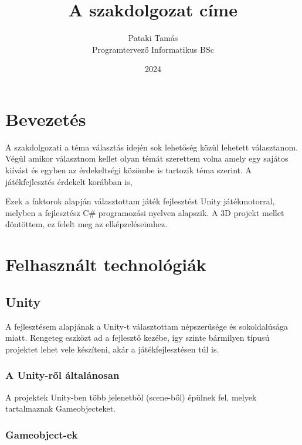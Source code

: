 \documentclass[
]{thesis-ekf}
\theoremstyle{definition}
\theoremstyle{remark}
\begin{document}
\title{A szakdolgozat címe}
\author{Pataki Tamás\\Programtervező Informatikus BSc}
\date{2024}
\maketitle

\tableofcontents

\chapter*{Bevezetés}
A szakdolgozati a téma választás idején sok lehetőség közül lehetett választanom.
Végül amikor választnom kellet olyan témát szerettem volna amely egy sajátos kiívást és egyben az érdekeltségi közömbe is tartozik téma szerint.
A játékfejlesztés érdekelt korábban is, 

Ezek a faktorok alapján választottam játék fejlesztést Unity\cite{Unity} játékmotorral, melyben a fejlesztész C\# programozási nyelven alapszik. A 3D projekt mellet döntöttem, ez felelt meg az elképzeléseimhez. 

\chapter{Felhasznált technológiák}

\section{Unity}

A fejlesztésem alapjának a Unity-t választottam népszerűsége és sokoldalúsága miatt. Rengeteg eszközt ad a fejlesztő kezébe, így szinte bármilyen típusú projektet lehet vele készíteni, akár a játékfejlesztésen túl is.

\subsection{A Unity-ről általánosan}

A projektek Unity-ben több jelenetből (scene-ből) épülnek fel, melyek tartalmaznak Gameobjecteket.

\subsection{Gameobject-ek}
\end{document}
